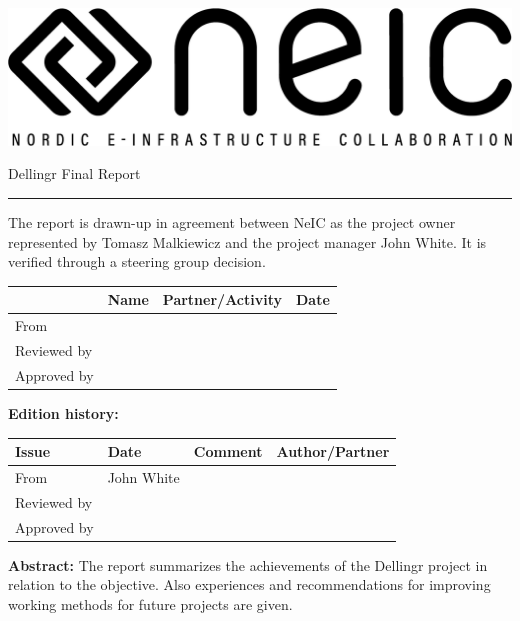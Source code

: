 \documentclass{article}
\newcommand{\dell}{Dellingr\xspace}
\begin{document}
\begin{center}
\includegraphics[width=\textwidth]{neic_logo_large.png}
\end{center}

\vspace{0.5in}
{\Huge  \dell Final Report} \hrule
\vspace{0.5in}

\noindent
{\large

{The report is drawn-up in agreement between NeIC as the project owner represented by Tomasz Malkiewicz and the project manager John White. 
It is verified through a steering group decision.
}
}

\begin{center}
\begin{tabular}{|l| l| l| l|} \hline

& Name
& Partner/Activity
& Date \\ \hline
From & 
 &
& 
\\ \hline
Reviewed by &
& 
& 
\\ \hline
Approved by &
& 
& 
\\ \hline
\end{tabular}
\end{center}

{\bf \large Edition history:}

\begin{center}
\begin{tabular}{|l| l| l| l|} \hline
Issue
& Date
& Comment
& Author/Partner \\ \hline
From & 
John White &
& 
\\ \hline
Reviewed by &
& 
& 
\\ \hline
Approved by &
& 
& 
\\ \hline
\end{tabular}
\end{center}

{\bf \large Abstract:}
\noindent
{The report summarizes the achievements of the \dell project in relation to the objective. Also  experiences and recommendations for improving working methods for future projects are given.}
\end{document}
